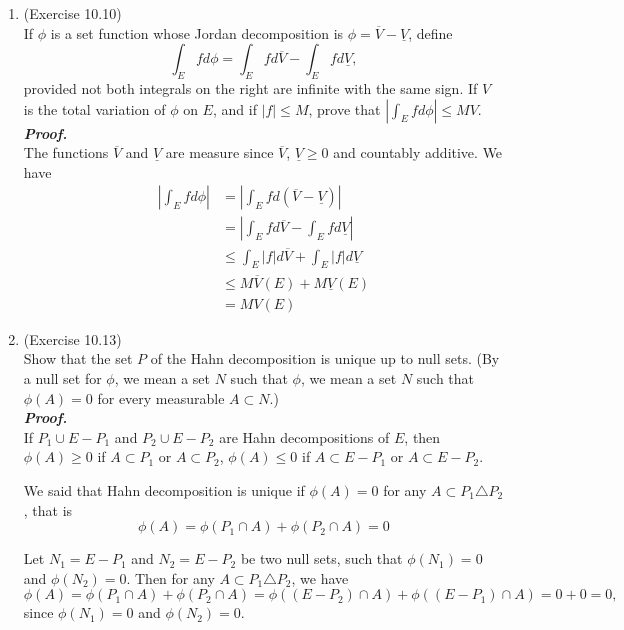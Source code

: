 \documentclass[a4paper,11pt]{article}
\begin{document}
\begin{enumerate}

	\item (Exercise 10.10)\\
		If $\phi$ is a set function whose Jordan decomposition is $\phi = \overline{V} - \underline{V}$, define
			$$\int_E f d\phi = \int_E f d\overline{V} - \int_E f d\underline{V},$$
		provided not both integrals on the right are infinite with the same sign. If $V$ is the total variation of $\phi$ on $E$, and if $|f| \leq M$, prove that $|\int_E f d\phi| \leq MV$.\\
	\newline
	\textit{\textbf {Proof.}}\\
		The functions $\overline{V}$ and $\underline{V}$ are measure since $\overline{V}$, $\underline{V} \geq 0$ and countably additive. We have
			$$\begin{aligned}
			|\int_E f d\phi|
			&= |\int_E f d(\overline{V} - \underline{V})|\\
			&= |\int_E f d\overline{V} - \int_E f d\underline{V}|\\
			&\leq \int_E |f| d\overline{V} + \int_E |f| d\underline{V}\\
			&\leq M \overline{V}(E) + M \underline{V}(E)\\
			&= MV(E)
			\end{aligned}$$




	\item (Exercise 10.13)\\
		Show that the set $P$ of the Hahn decomposition is unique up to null sets. (By a null set for $\phi$, we mean a set $N$ such that $\phi$, we mean a set $N$ such that $\phi(A) = 0$ for every measurable $A \subset N$.)\\
	\newline
	\textit{\textbf {Proof.}}\\
		If $P_1 \cup E - P_1$ and $P_2 \cup E - P_2$ are Hahn decompositions of $E$, then $\phi(A) \geq 0$ if $A \subset P_1$ or $A \subset P_2$, $\phi(A) \leq 0$ if $A \subset E - P_1$ or $A \subset E - P_2$.\

		We said that Hahn decomposition is unique if $\phi(A) = 0$ for any $A \subset P_1 \triangle P_2$, that is
			$$\phi(A) = \phi(P_1 \cap A) + \phi(P_2 \cap A) = 0$$

		Let $N_1 = E - P_1$ and $N_2 = E - P_2$ be two null sets, such that $\phi(N_1) = 0$ and $\phi(N_2) = 0$. Then for any $A \subset P_1 \triangle P_2$, we have
			$$\phi(A) = \phi(P_1 \cap A) + \phi(P_2 \cap A) = \phi((E - P_2) \cap A) + \phi((E - P_1) \cap A) = 0 + 0 = 0,$$
		since $\phi(N_1) = 0$ and $\phi(N_2) = 0$.\


\end{enumerate}
\end{document}
